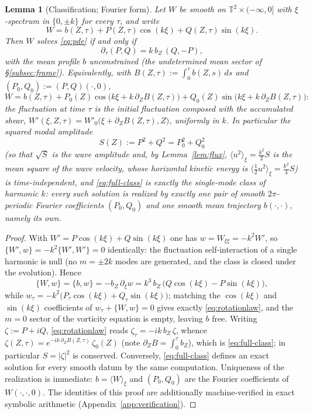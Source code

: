 \documentclass[11pt]{amsart}
\newtheorem{lemma}[theorem]{Lemma}
\theoremstyle{definition}
\theoremstyle{remark}
\newcommand{\T}{\mathbb{T}}
\newcommand{\mean}[1]{\langle #1\rangle}
\begin{document}
\begin{lemma}[Classification; Fourier form]\label{lem:class-cartesian}
Let $W$ be smooth on $\T^2\times(-\infty,0]$ with $\xi$-spectrum in
$\{0,\pm k\}$ for every $\tau$, and write
\[
  W=b(Z,\tau)+P(Z,\tau)\cos(k\xi)+Q(Z,\tau)\sin(k\xi) .
\]
Then $W$ solves \eqref{eq:pde} if and only if
\begin{equation}\label{eq:rotationlaw}
  \partial_\tau(P,Q)=k\,b_Z\,(Q,-P),
\end{equation}
with the mean profile $b$ unconstrained (the undetermined mean sector of
\S\ref{subsec:frame}). Equivalently, with
$B(Z,\tau):=\int_0^\tau b(Z,s)\,ds$ and $(P_0,Q_0):=(P,Q)(\cdot,0)$,
\begin{equation}\label{eq:full-class}
  W=b(Z,\tau)+P_0(Z)\cos\bigl(k\xi+k\,\partial_ZB(Z,\tau)\bigr)
   +Q_0(Z)\sin\bigl(k\xi+k\,\partial_ZB(Z,\tau)\bigr):
\end{equation}
the fluctuation at time $\tau$ is the initial fluctuation composed with
the accumulated shear,
$W'(\xi,Z,\tau)=W'_0\bigl(\xi+\partial_ZB(Z,\tau),Z\bigr)$, uniformly in
$k$. In particular the \emph{squared modal amplitude}
\[
  S(Z):=P^2+Q^2=P_0^2+Q_0^2
\]
(so that $\sqrt S$ is the wave amplitude and, by Lemma~\ref{lem:flux},
$\mean{u^2}_\xi=\tfrac{k^2}2S$ is the mean square of the wave velocity,
whose horizontal kinetic energy is $\mean{\tfrac12u^2}_\xi=\tfrac{k^2}4S$)
is time-independent, and \eqref{eq:full-class} is \emph{exactly} the
single-mode class of harmonic $k$: every such solution is realized by
exactly one pair of smooth $2\pi$-periodic Fourier coefficients
$(P_0,Q_0)$ and one smooth mean trajectory $b(\cdot,\cdot)$, namely its
own.
\end{lemma}

\begin{proof}
With $W'=P\cos(k\xi)+Q\sin(k\xi)$ one has $w=W_{\xi\xi}=-k^2W'$, so
$\{W',w\}=-k^2\{W',W'\}=0$ identically: the fluctuation self-interaction
of a single harmonic is null (no $m=\pm2k$ modes are generated, and the
class is closed under the evolution). Hence
\[
  \{W,w\}=\{b,w\}=-b_Z\,\partial_\xi w
  =k^3\,b_Z\,\bigl(Q\cos(k\xi)-P\sin(k\xi)\bigr),
\]
while $w_\tau=-k^2\bigl(P_\tau\cos(k\xi)+Q_\tau\sin(k\xi)\bigr)$;
matching the $\cos(k\xi)$ and $\sin(k\xi)$ coefficients of
$w_\tau+\{W,w\}=0$ gives exactly \eqref{eq:rotationlaw}, and the $m=0$
sector of the vorticity equation is empty, leaving $b$ free. Writing
$\zeta:=P+iQ$, \eqref{eq:rotationlaw} reads
$\zeta_\tau=-ik\,b_Z\,\zeta$, whence
$\zeta(Z,\tau)=e^{-ik\,\partial_ZB(Z,\tau)}\,\zeta_0(Z)$ (note
$\partial_ZB=\int_0^\tau b_Z$), which is \eqref{eq:full-class}; in
particular $S=|\zeta|^2$ is conserved. Conversely,
\eqref{eq:full-class} defines an exact solution for every smooth datum
by the same computation. Uniqueness of the realization is immediate:
$b=\mean{W}_\xi$ and $(P_0,Q_0)$ are the Fourier coefficients of
$W(\cdot,\cdot,0)$. The identities of this proof are additionally
machine-verified in exact symbolic arithmetic
(Appendix~\ref{app:verification}).
\end{proof}
\end{document}
